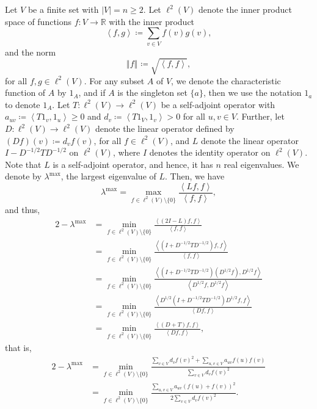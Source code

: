 \documentclass[12pt,a4paper,bold]{thesis}
\theoremstyle{definition}
\newcommand*{\map}[3]{#1 \colon #2 \to #3}
\newcommand*{\ip}[2]{\left\langle #1 , #2 \right\rangle}
\newcommand*{\norm}[2][]{\left\Vert #2 \right\Vert_{#1}}
\begin{document}
Let $V$ be a finite set with $|V| = n \geq 2$. Let $\ell^2(V)$ denote 
the inner product space of functions $\map{f}{V}{\mathbb{R}}$ with the inner product
\begin{equation*}
    \ip{f}{g} \coloneq \sum_{v \in V} f(v)g(v),
\end{equation*}
and the norm 
\begin{equation*}
    \norm{f} \coloneq \sqrt{\ip{f}{f}},
\end{equation*}
for all $f, g \in \ell^2(V)$. For any subset $A$ of $V$, we denote the characteristic
function of $A$ by $1_A$, and if $A$ is the singleton set $\{a\}$, then we use 
the notation $1_a$ to denote $1_A$. Let $\map{T}{\ell^2(V)}{\ell^2(V)}$ be 
a self-adjoint operator with $a_{uv} \coloneq \ip{T1_v}{1_u} \geq 0$ and  
$d_v \coloneq \ip{T1_V}{1_v} > 0$ for all $u,v \in V$. 
Further, let $\map{D}{\ell^2(V)}{\ell^2(V)}$ denote the linear operator defined by 
$(Df)(v) \coloneq d_v f(v)$, for all $f \in \ell^2(V)$, 
and $L$ denote the linear operator $I - D^{-1/2}TD^{-1/2}$ on $\ell^2(V)$, 
where $I$ denotes the identity operator on $\ell^2(V)$. 
Note that $L$ is a self-adjoint operator, and hence, it has $n$ real eigenvalues. 
We denote by $\lambda^{\max}$, the largest eigenvalue of $L$. Then, we have
\begin{equation*}
    \lambda^{\max} = \max_{f \in \ell^2(V) \setminus \{0\}} \frac{\ip{Lf}{f}}{\ip{f}{f}},
\end{equation*} 
and thus,
\begin{align} \label{eq:implicit-gap}
    2 - \lambda^{\max} 
    & = 
    \min_{f \in \ell^2(V) \setminus \{0\}} \frac{\ip{(2I - L)f}{f}}{\ip{f}{f}} \nonumber
    \\
    & = 
    \min_{f \in \ell^2(V) \setminus \{0\}} 
    \frac{\ip{(I + D^{-1/2}TD^{-1/2})f}{f}}{\ip{f}{f}} \nonumber
    \\
    & =
    \min_{f \in \ell^2(V) \setminus \{0\}} 
    \frac{\ip{(I + D^{-1/2}TD^{-1/2})(D^{1/2}f)}{D^{1/2}f}}{\ip{D^{1/2}f}{D^{1/2}f}} \nonumber
    \\
    & =
    \min_{f \in \ell^2(V) \setminus \{0\}} 
    \frac{\ip{D^{1/2}(I + D^{-1/2}TD^{-1/2})D^{1/2}f}{f}}{\ip{Df}{f}} \nonumber
    \\
    & =
    \min_{f \in \ell^2(V) \setminus \{0\}} \frac{\ip{(D + T)f}{f}}{\ip{Df}{f}}, 
\end{align} 
that is,
\begin{align} \label{eq:explicit-gap}
    2 - \lambda^{\max}
    & =
    \min_{f \in \ell^2(V) \setminus \{0\}} \frac{\sum_{v \in V} d_v f(v)^2 
    + \sum_{u,v \in V} a_{uv} f(u) f(v)}{\sum_{v \in V} d_v f(v)^2} \nonumber
    \\
    & =
    \min_{f \in \ell^2(V) \setminus \{0\}} 
    \frac{\sum_{u,v \in V} a_{uv} (f(u) + f(v))^2}{2 \sum_{v \in V} d_v f(v)^2}.
\end{align}
\end{document}
